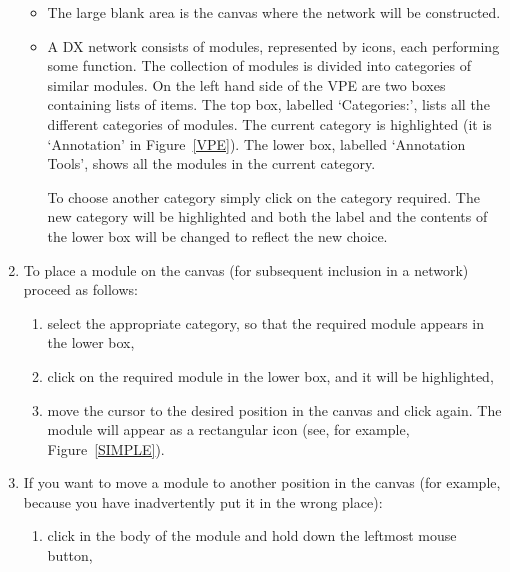 \documentclass[twoside,11pt]{starlink}
\begin{document}
\begin{enumerate}
  \begin{itemize}

    \item The large blank area is the canvas where the network will be
     constructed.

    \item A DX network consists of modules, represented by icons, each
     performing some function. The collection of modules is divided
     into categories of similar modules. On the left hand side of the
     VPE are two boxes containing lists of items. The top box, labelled
     `Categories:', lists all the different categories of modules. The
     current category is highlighted (it is `Annotation' in
     Figure~\ref{VPE}). The lower box, labelled `Annotation Tools',
     shows all the modules in the current category.

     To choose another category simply click on the category required.
     The new category will be highlighted and both the label and the
     contents of the lower box will be changed to reflect the new
     choice.

  \end{itemize}

  \item To place a module on the canvas (for subsequent inclusion in a
   network) proceed as follows:

  \begin{enumerate}

    \item select the appropriate category, so that the required module
     appears in the lower box,

    \item click on the required module in the lower box, and it will be
     highlighted,

    \item move the cursor to the desired position in the canvas and
     click again. The module will appear as a rectangular icon (see,
     for example, Figure~\ref{SIMPLE}).

  \end{enumerate}

  \item If you want to move a module to another position in the canvas
   (for example, because you have inadvertently put it in the wrong
   place):

  \begin{enumerate}

    \item click in the body of the module and hold down the leftmost
     mouse button,


\end{enumerate}
\end{enumerate}
\end{document}

